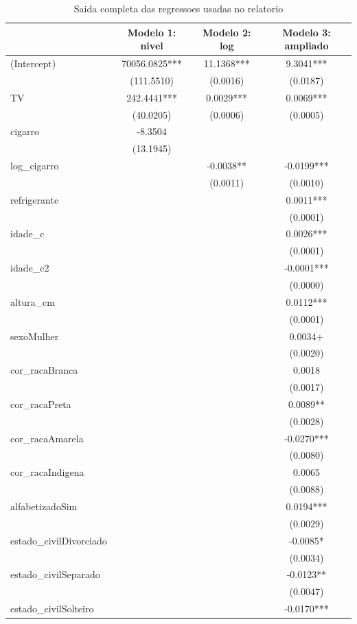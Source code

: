\begin{table}
\centering
\caption{Saida completa das regressoes usadas no relatorio}
\centering
\begin{tabular}[t]{lccc}
\toprule
  & Modelo 1: nivel & Modelo 2: log & Modelo 3: ampliado\\
\midrule
(Intercept) & 70056.0825*** & 11.1368*** & 9.3041***\\
 & (111.5510) & (0.0016) & (0.0187)\\
TV & 242.4441*** & 0.0029*** & 0.0069***\\
 & (40.0205) & (0.0006) & (0.0005)\\
cigarro & -8.3504 &  & \\
 & (13.1945) &  & \\
log\_cigarro &  & -0.0038** & -0.0199***\\
 &  & (0.0011) & (0.0010)\\
refrigerante &  &  & 0.0011***\\
 &  &  & \vphantom{2} (0.0001)\\
idade\_c &  &  & 0.0026***\\
 &  &  & \vphantom{1} (0.0001)\\
idade\_c2 &  &  & -0.0001***\\
 &  &  & (0.0000)\\
altura\_cm &  &  & 0.0112***\\
 &  &  & (0.0001)\\
sexoMulher &  &  & 0.0034+\\
 &  &  & (0.0020)\\
cor\_racaBranca &  &  & 0.0018\\
 &  &  & (0.0017)\\
cor\_racaPreta &  &  & 0.0089**\\
 &  &  & (0.0028)\\
cor\_racaAmarela &  &  & -0.0270***\\
 &  &  & (0.0080)\\
cor\_racaIndigena &  &  & 0.0065\\
 &  &  & (0.0088)\\
alfabetizadoSim &  &  & 0.0194***\\
 &  &  & \vphantom{1} (0.0029)\\
estado\_civilDivorciado &  &  & -0.0085*\\
 &  &  & (0.0034)\\
estado\_civilSeparado &  &  & -0.0123**\\
 &  &  & (0.0047)\\
estado\_civilSolteiro &  &  & -0.0170***\\

\end{tabular}
\end{table}
